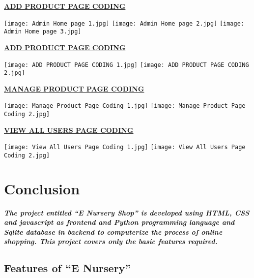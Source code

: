\documentclass[12pt]{report}
\begin{document}
    \pagebreak
    \textbf{\underline{\large ADD PRODUCT PAGE CODING}}
    \begin{center}
        \texttt{[image: Admin Home page 1.jpg]}
        \texttt{[image: Admin Home page 2.jpg]}
        \texttt{[image: Admin Home page 3.jpg]}
    \end{center}
    
    \pagebreak
    \textbf{\underline{\large ADD PRODUCT PAGE CODING}}
    \begin{center}
        \texttt{[image: ADD PRODUCT PAGE CODING 1.jpg]}
        \texttt{[image: ADD PRODUCT PAGE CODING 2.jpg]}
    \end{center}
    
    \pagebreak
    \textbf{\underline{\large \MakeUppercase{Manage Product Page Coding}}}
    \begin{center}
        \texttt{[image: Manage Product Page Coding 1.jpg]}
        \texttt{[image: Manage Product Page Coding 2.jpg]}
    \end{center}
    
     \pagebreak
    \textbf{\underline{\large \MakeUppercase{ View All Users Page Coding}}}
    \begin{center}
        \texttt{[image: View All Users Page Coding 1.jpg]}
        \texttt{[image: View All Users Page Coding 2.jpg]}
    \end{center}
    \chapter{Conclusion}
    \paragraph
    {
    The project entitled “E Nursery Shop” is developed using HTML, CSS and javascript as frontend and Python programming language and Sqlite database in backend to computerize the process of online shopping. This project covers only the basic features required.
    }
        \section{Features of “E Nursery”}
\end{document}
